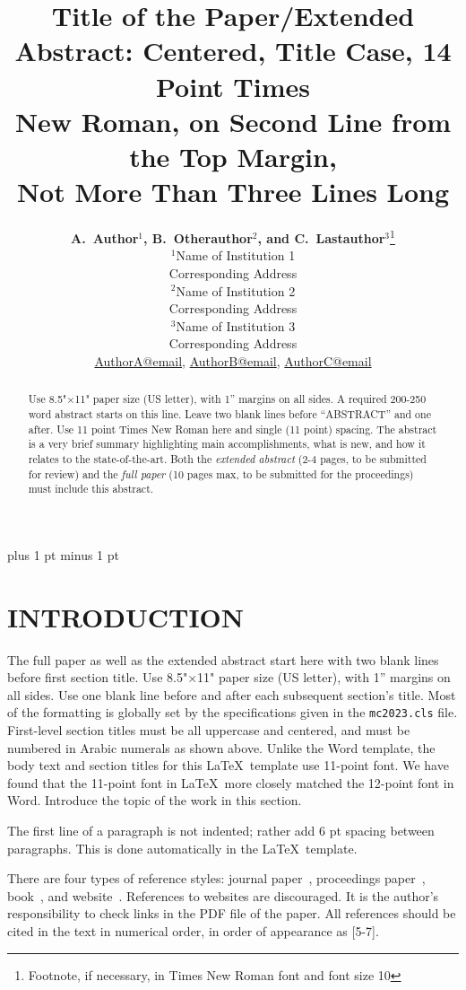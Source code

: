 \documentclass[letterpaper]{mc2023}
\title{Title of the Paper/Extended Abstract: Centered, Title Case, 14 Point Times \\
  New Roman, on Second Line from the Top Margin,\\ Not
  More Than Three Lines Long}
\author{%
  \textbf{A.~Author$^1$, B.~Otherauthor$^2$, and C.~Lastauthor$^3$}\footnote{Footnote, if necessary, in Times New Roman font and font size 10}\vspace{3pt} \\
  $^1$Name of Institution 1  \\
  Corresponding Address \vspace{6pt}\\ 
  $^2$Name of Institution 2  \\ 
    Corresponding Address\vspace{6pt} \\ 
  $^3$Name of Institution 3  \\
     Corresponding Address\vspace{6pt} \\
  \url{AuthorA@email}, \url{AuthorB@email}, \url{AuthorC@email}
}
\begin{document}
\maketitle
\justify 
\parskip 6pt plus 1 pt minus 1 pt

\begin{abstract}
  Use 8.5"$\times$11" paper size (US letter), with 1'' margins on all sides.  A required 200-250 
  word abstract starts on this line.  Leave two blank lines before ``ABSTRACT''
  and one after.  Use 11 point Times New Roman here and single (11 point) 
  spacing. The abstract is a very brief summary highlighting main 
  accomplishments, what is new, and how it relates to the state-of-the-art.
Both the {\it extended abstract} (2-4 pages, to be submitted for review) and the {\it full paper} (10 pages max, to be submitted for the proceedings) must include this abstract.  
\end{abstract}
\vspace{6pt}

\section{INTRODUCTION} 
The full paper as well as the extended abstract start here with two blank lines before first section title.  Use 
8.5"$\times$11" paper size (US letter), with 1'' margins on all sides.  Use one blank line 
before and after each subsequent section's title.  Most of the formatting is globally
set by the specifications given in the \texttt{mc2023.cls} file.  
First-level section titles must be all uppercase and centered, and must 
be numbered in Arabic numerals as shown above.  Unlike the Word template, the body
text and section titles for this \LaTeX\ template use 
11-point font.  We have found that the 11-point font in \LaTeX\ more closely 
matched the 12-point font in Word.  Introduce the topic of the work 
in this section.

The first line of a paragraph is not indented; rather add 6 pt spacing between 
paragraphs.  This is done automatically in the \LaTeX\ template.

There are four types of reference styles: journal paper~\cite{journal}, 
proceedings paper~\cite{proc_paper}, book~\cite{book}, and website~\cite{website}.
References to websites are discouraged. It 
is the author's responsibility to check links in the PDF file of the paper. 
All references should be cited in the text in numerical order, in order of 
appearance as [5-7].
\end{document}

